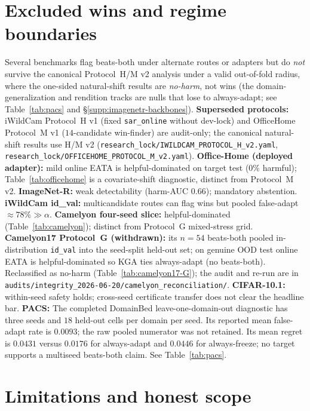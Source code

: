 \documentclass[conference]{IEEEtran}
\theoremstyle{plain}
\theoremstyle{definition}
\begin{document}
\section{Excluded wins and regime boundaries}\label{sec:excluded-wins}
Several benchmarks flag beats-both under alternate routes or adapters but do \emph{not} survive the
canonical Protocol~H/M v2 analysis under a valid out-of-fold radius, where the one-sided
natural-shift results are \emph{no-harm}, not wins (the domain-generalization and rendition tracks
are nulls that lose to always-adapt; see Table~\ref{tab:pacs} and
\S\ref{supp:imagenetr-backbones}). \textbf{Superseded protocols:}
iWildCam Protocol~H v1 (fixed \texttt{sar\_online} without dev-lock) and OfficeHome Protocol~M v1
($14$-candidate win-finder) are audit-only; the canonical natural-shift results use H/M v2
(\texttt{research\_lock/IWILDCAM\_PROTOCOL\_H\_v2.yaml},
\texttt{research\_lock/OFFICEHOME\_PROTOCOL\_M\_v2.yaml}).
\textbf{Office-Home (deployed adapter):} mild online EATA is helpful-dominated on target test
($0\%$ harmful); Table~\ref{tab:officehome} is a covariate-shift diagnostic, distinct from
Protocol~M v2. \textbf{ImageNet-R:} weak detectability (harm-AUC $0.66$); mandatory abstention.
\textbf{iWildCam id\_val:} multicandidate routes can flag wins but pooled false-adapt $\approx 78\%\gg\alpha$.
\textbf{Camelyon four-seed slice:} helpful-dominated (Table~\ref{tab:camelyon}); distinct from
Protocol~G mixed-stress grid.
\textbf{Camelyon17 Protocol~G (withdrawn):} its $n{=}54$ beats-both pooled in-distribution
\texttt{id\_val} into the seed-split held-out set; on genuine OOD test online EATA is
helpful-dominated so \textsc{KGA} ties always-adapt (no beats-both). Reclassified as no-harm
(Table~\ref{tab:camelyon17-G}); the audit and re-run are in
\texttt{audits/integrity\_2026-06-20/camelyon\_reconciliation/}. \textbf{CIFAR-10.1:} within-seed safety holds; cross-seed certificate
transfer does not clear the headline bar.
\textbf{PACS:} The completed DomainBed leave-one-domain-out diagnostic has three seeds and
$18$ held-out cells per domain per seed. Its reported mean false-adapt rate is $0.0093$; the raw
pooled numerator was not retained. Its mean regret is $0.0431$ versus $0.0176$ for always-adapt and $0.0446$ for
always-freeze; no target supports a multiseed beats-both claim. See Table~\ref{tab:pacs}.


\section{Limitations and honest scope}\label{sec:limits}

\end{document}
